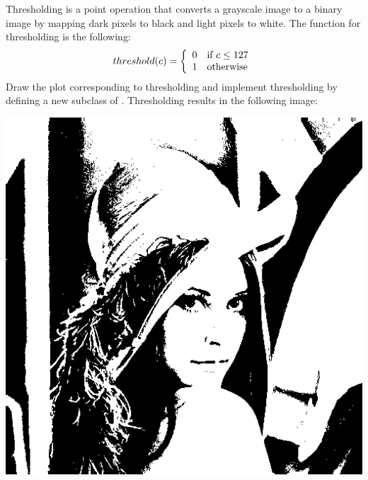 \documentclass{book}
\begin{document}
\begin{exercise}
Thresholding is a point operation that converts a grayscale image to a binary image by mapping dark pixels to black and light pixels to white. The function for thresholding is the following:
$$threshold(c) = \left\{\begin{array}{c l}
  0 & \text{if $c \leq 127$}\\
  1 & \text{otherwise}\\
\end{array}
\right.$$
Draw the plot corresponding to thresholding and implement thresholding by defining a new subclass  of . Thresholding  results in the following image:
\begin{center}
\includegraphics[scale=0.10]{lena-binary.png}
\end{center}
\end{exercise}
\end{document}
